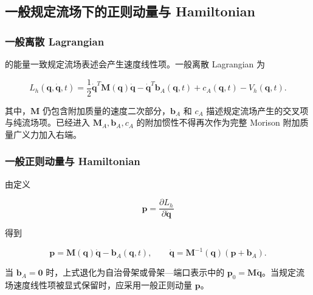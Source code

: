 \subsection{一般规定流场下的正则动量与 Hamiltonian}\label{sec:hamiltonian-3-5}

\subsubsection{一般离散 Lagrangian}\label{sec:hamiltonian-3-5-1}

的能量一致规定流场表述会产生速度线性项。一般离散 Lagrangian 为\cite{MarsdenRatiu1999MechanicsSymmetry,Arnold1989ClassicalMechanics}

\begin{equation}
\label{eq:hamiltonian-3-42}
\boxed{L_{h}\left( \mathbf{q},\dot{\mathbf{q}},t \right) = \frac{1}{2}{\dot{\mathbf{q}}}^{T}\mathbf{M}\left( \mathbf{q} \right)\dot{\mathbf{q}} - {\dot{\mathbf{q}}}^{T}\mathbf{b}_{A}\left( \mathbf{q},t \right) + c_{A}\left( \mathbf{q},t \right) - V_{h}\left( \mathbf{q},t \right).}
\end{equation}

其中，\(\mathbf{M}\) 仍包含附加质量的速度二次部分，\(\mathbf{b}_{A}\) 和 \(c_{A}\) 描述规定流场产生的交叉项与纯流场项。已经进入 \(\mathbf{M}_{A},\mathbf{b}_{A},c_{A}\) 的附加惯性不得再次作为完整 Morison 附加质量广义力加入右端。

\subsubsection{一般正则动量与 Hamiltonian}\label{sec:hamiltonian-3-5-2}

由定义

\begin{equation}
\label{eq:hamiltonian-3-43}
\mathbf{p} = \frac{\partial L_{h}}{\partial\dot{\mathbf{q}}}
\end{equation}

得到

\begin{equation}
\label{eq:hamiltonian-3-44}
\boxed{\mathbf{p} = \mathbf{M}\left( \mathbf{q} \right)\dot{\mathbf{q}} - \mathbf{b}_{A}\left( \mathbf{q},t \right),\quad\quad\dot{\mathbf{q}} = \mathbf{M}^{- 1}\left( \mathbf{q} \right)\left( \mathbf{p} + \mathbf{b}_{A} \right).}
\end{equation}

当 \(\mathbf{b}_{A} = \mathbf{0}\) 时，上式退化为自治骨架或骨架---端口表示中的 \(\mathbf{p}_{0} = \mathbf{M}\dot{\mathbf{q}}\)。当规定流场速度线性项被显式保留时，应采用一般正则动量 \(\mathbf{p}\)。

